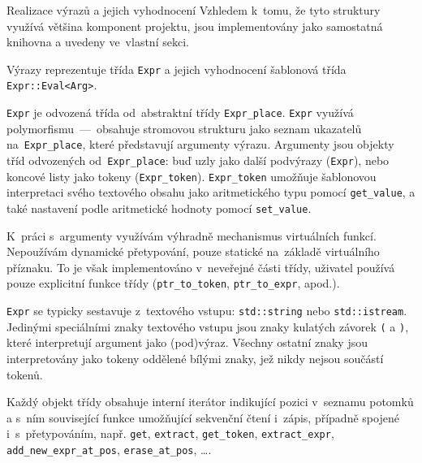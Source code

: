 \documentclass[thesis=M,czech]{FITthesis}[2012/06/26]
\newcommand{\id}[1]{\texttt{#1}}
\begin{document}

\begin{section}{Realizace výrazů a jejich vyhodnocení}
\label{s:impl:exprs}
Vzhledem k~tomu, že tyto struktury využívá většina komponent projektu,
jsou implementovány jako samostatná knihovna
a uvedeny ve~vlastní sekci.

Výrazy reprezentuje třída \id{Expr}
a jejich vyhodnocení šablonová třída \id{Expr::\-Eval<Arg>}.


\begin{paragraph}{\id{Expr}}\label{p:impl:exprs:expr}
je odvozená třída od~abstraktní třídy \id{Expr\_\-place}.
\id{Expr} využívá polymorfismu~---~obsahuje
stromovou strukturu jako seznam ukazatelů na~\id{Expr\_\-place},
které představují argumenty výrazu.
Argumenty jsou objekty tříd odvozených od~\id{Expr\_\-place}:
buď uzly jako další podvýrazy (\id{Expr}),
nebo koncové listy jako tokeny (\id{Expr\_\-token}).
\id{Expr\_\-token} umožňuje šablonovou
interpretaci svého textového obsahu
jako aritmetického typu pomocí \id{get\_\-value},
a také nastavení podle aritmetické hodnoty pomocí \id{set\_\-value}.

K~práci s~argumenty využívám výhradně
mechanismus virtuálních funkcí.
Nepoužívám dynamické přetypování,
pouze statické na~základě virtuálního příznaku.
To je však implementováno v~neveřejné části třídy,
uživatel používá pouze explicitní funkce třídy
(\id{ptr\_\-to\_\-token}, \id{ptr\_\-to\_\-expr}, apod.).

\id{Expr} se typicky sestavuje z~textového vstupu:
\id{std::\-string} nebo \id{std::\-istream}.
Jedinými speciálními znaky textového vstupu
jsou znaky kulatých závorek \id{(} a \id{)},
které interpretují argument jako (pod)výraz.
Všechny ostatní znaky jsou interpretovány jako tokeny
oddělené bílými znaky, jež nikdy nejsou součástí tokenů.

Každý objekt třídy obsahuje interní iterátor
indikující pozici v~seznamu potomků
a s~ním související funkce
umožňující sekvenční čtení i~zápis,
případně spojené i~s~přetypováním,
např. \id{get}, \id{extract},
\id{get\_\-token}, \id{extract\_\-expr},
\id{add\_\-new\_\-expr\_\-at\_\-pos},
\id{erase\_\-at\_\-pos}, \dots.


\end{paragraph}
\end{section}
\end{document}

